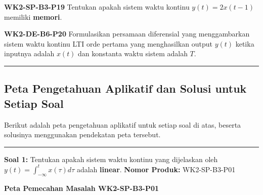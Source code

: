 \documentclass[
  letterpaper,
  DIV=11,
  numbers=noendperiod]{scrreprt}
\begin{document}
\textbf{WK2-SP-B3-P19} Tentukan apakah sistem waktu kontinu
\(y(t) = 2x(t-1)\) memiliki \textbf{memori}.

\textbf{WK2-DE-B6-P20} Formulasikan persamaan diferensial yang
menggambarkan sistem waktu kontinu LTI orde pertama yang menghasilkan
output \(y(t)\) ketika inputnya adalah \(x(t)\) dan konstanta waktu
sistem adalah \(T\).

\begin{center}\rule{0.5\linewidth}{0.5pt}\end{center}

\subsection{Peta Pengetahuan Aplikatif dan Solusi untuk Setiap
Soal}\label{peta-pengetahuan-aplikatif-dan-solusi-untuk-setiap-soal}

Berikut adalah peta pengetahuan aplikatif untuk setiap soal di atas,
beserta solusinya menggunakan pendekatan peta tersebut.

\begin{center}\rule{0.5\linewidth}{0.5pt}\end{center}

\textbf{Soal 1:} Tentukan apakah sistem waktu kontinu yang dijelaskan
oleh \(y(t) = \int_{-\infty}^{t} x(\tau) d\tau\) adalah \textbf{linear}.
\textbf{Nomor Produk:} WK2-SP-B3-P01

\textbf{Peta Pemecahan Masalah WK2-SP-B3-P01}
\end{document}
